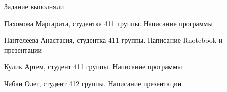 \documentclass[9pt]{beamer}
\begin{document}
\begin{frame}{Задание выполняли}
	\begin{itemize}
		{\small
		\item Пахомова Маргарита, студентка 411 группы. Написание программы
		\item Пантелеева Анастасия, студентка 411 группы. Написание Rnotebook и презентации
		\item Кулик Артем, студент 411 группы. Написание программы
		\item Чабан Олег, студент 412 группы. Написание презентации}
	\end{itemize}	

\end{frame}
\end{document}
